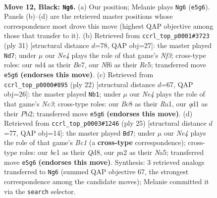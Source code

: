 \documentclass[11pt]{article}
\begin{document}
\clearpage

\begin{figure}[p]\centering
\begin{subfigure}{0.46\textwidth}\centering
\resizebox{\linewidth}{!}{%
\newchessgame
\chessboard[
  setfen={r1bq1rk1/2p1bppp/p2p1n2/4n3/1pPNPP1P/1B6/PP4P1/RNBQR1K1 b - - 0 12},
  showmover=false,
  pgfstyle=straightmove, color=movearrow, markmove={e5-g6}
]}
\caption{}
\end{subfigure}\hfill
\begin{subfigure}{0.46\textwidth}\centering
\resizebox{\linewidth}{!}{%
\newchessgame
\chessboard[
  setfen={2bq1rk1/4bppp/4pn2/2rpP3/Pp6/1B6/1P1N1PPP/R1BQR1K1 b - - 0 16},
  showmover=false,
  pgfstyle=straightmove, color=movearrow, markmove={f6-d7}
]}
\caption{}
\end{subfigure}
\\[4pt]
\begin{subfigure}{0.46\textwidth}\centering
\resizebox{\linewidth}{!}{%
\newchessgame
\chessboard[
  setfen={r3k1nr/1bq1bppp/p1npp3/8/Pp2PP2/1NNBB3/1PP3PP/R2Q1RK1 w kq - 0 12},
  showmover=false,
  pgfstyle=straightmove, color=movearrow, markmove={c3-b1}
]}
\caption{}
\end{subfigure}\hfill
\begin{subfigure}{0.46\textwidth}\centering
\resizebox{\linewidth}{!}{%
\newchessgame
\chessboard[
  setfen={r1bq1rk1/4bppp/p2p1n2/np6/3NP3/7P/PPB2PP1/RNBQ1RK1 b - - 0 13},
  showmover=false,
  pgfstyle=straightmove, color=movearrow, markmove={c8-d7}
]}
\caption{}
\end{subfigure}
\caption{\textbf{Move 12, Black: \texttt{Ng6}.} (a) Our position; Melanie plays \texttt{Ng6} (\texttt{e5g6}). Panels (b)--(d) are the retrieved master positions whose correspondence most drove this move (highest QAP objective among those that transfer to it). (b) Retrieved from \texttt{ccrl\_top\_p0001\#3723} (ply 31) [structural distance $d$=78, QAP obj=27]: the master played \texttt{Nd7}; under $\mu$ our \emph{Ne4} plays the role of that game's \emph{Nf3}; cross-type roles: our \emph{n}d4 as their \emph{B}e7, our \emph{N}f6 as their \emph{R}c5; transferred move \texttt{e5g6} \textbf{(endorses this move)}. (c) Retrieved from \texttt{ccrl\_top\_p0000\#895} (ply 22) [structural distance $d$=67, QAP obj=26]: the master played \texttt{Nb1}; under $\mu$ our \emph{Ne4} plays the role of that game's \emph{Nc3}; cross-type roles: our \emph{B}c8 as their \emph{R}a1, our \emph{q}d1 as their \emph{P}b2; transferred move \texttt{e5g6} \textbf{(endorses this move)}. (d) Retrieved from \texttt{ccrl\_top\_p0003\#1246} (ply 25) [structural distance $d$=77, QAP obj=14]: the master played \texttt{Bd7}; under $\mu$ our \emph{Ne4} plays the role of that game's \emph{Bc1} (a \textbf{cross-type} correspondence); cross-type roles: our \emph{b}c1 as their \emph{Q}d8, our \emph{p}a2 as their \emph{N}a5; transferred move \texttt{e5g6} \textbf{(endorses this move)}. Synthesis: 3 retrieved analogs transferred to \texttt{Ng6} (summed QAP objective 67, the strongest correspondence among the candidate moves); Melanie committed it via the \texttt{search} selector.}
\label{fig:thought-m23}
\end{figure}
\end{document}
